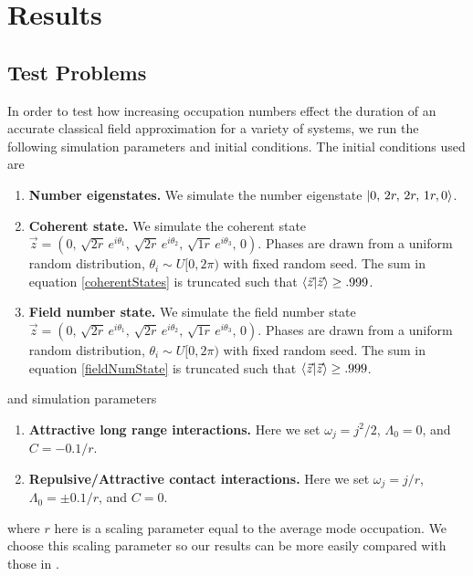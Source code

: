\documentclass[aps,prd,twocolumn,superscriptaddress]{revtex4-1}
\begin{document}
\section{Results} \label{sec:results}
\subsection{Test Problems}


In order to test how increasing occupation numbers effect the duration of an accurate classical field approximation for a variety of systems, we run the following simulation parameters and initial conditions. The initial conditions used are

\begin{enumerate}
    \item \textbf{Number eigenstates.} We simulate the number eigenstate  $\ket{0,\, 2r, \, 2r, \, 1r,0}$. 
    \item \textbf{Coherent state.} We simulate the coherent state $\vec z = (0,\,\sqrt{2r}\, e^{i\theta_1},\,\sqrt{2r}\,e^{i\theta_2} ,\,\sqrt{1r}\,e^{i\theta_3},\,0)$. Phases are drawn from a uniform random distribution, $\theta_i \sim U[0, 2\pi)$ with fixed random seed. The sum in equation \ref{coherentStates} is truncated such that $\braket{\vec z| \vec z} \ge .999$. 
    \item \textbf{Field number state.} We simulate the field number state $\vec z = (0,\,\sqrt{2r}\, e^{i\theta_1},\,\sqrt{2r}\,e^{i\theta_2} ,\,\sqrt{1r}\,e^{i\theta_3},\,0)$. Phases are drawn from a uniform random distribution, $\theta_i \sim U[0, 2\pi)$ with fixed random seed. The sum in equation \ref{fieldNumState} is truncated such that $\braket{\vec z| \vec z} \ge .999$.
\end{enumerate}

and simulation parameters

\begin{enumerate}
    \item \textbf{Attractive long range interactions.} Here we set $\omega_j = j^2 / 2$, $\Lambda_0= 0$, and $C = -0.1/r$.
    \item \textbf{Repulsive/Attractive contact interactions.} Here we set $\omega_j = j / r$, $\Lambda_0= \pm 0.1 / r$, and $C = 0$. 
\end{enumerate}
where $r$ here is a scaling parameter equal to the average mode occupation. We choose this scaling parameter so our results can be more easily compared with those in \cite{Sikivie2017}. 
\end{document}
